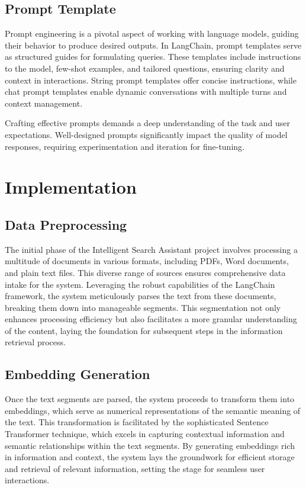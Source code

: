 \documentclass[12pt,a4paper,oneside]{report}
\begin{document}
\section{Prompt Template}
\par Prompt engineering is a pivotal aspect of working with language models, guiding their behavior to produce desired outputs. In LangChain, prompt templates serve as structured guides for formulating queries. These templates include instructions to the model, few-shot examples, and tailored questions, ensuring clarity and context in interactions. String prompt templates offer concise instructions, while chat prompt templates enable dynamic conversations with multiple turns and context management.

Crafting effective prompts demands a deep understanding of the task and user expectations. Well-designed prompts significantly impact the quality of model responses, requiring experimentation and iteration for fine-tuning.

\newpage
\chapter{Implementation}
\section{Data Preprocessing}
\par The initial phase of the Intelligent Search Assistant project involves processing a multitude of documents in various formats, including PDFs, Word documents, and plain text files. This diverse range of sources ensures comprehensive data intake for the system. Leveraging the robust capabilities of the LangChain framework, the system meticulously parses the text from these documents, breaking them down into manageable segments. This segmentation not only enhances processing efficiency but also facilitates a more granular understanding of the content, laying the foundation for subsequent steps in the information retrieval process.

\section{Embedding Generation}
\par Once the text segments are parsed, the system proceeds to transform them into embeddings, which serve as numerical representations of the semantic meaning of the text. This transformation is facilitated by the sophisticated Sentence Transformer technique, which excels in capturing contextual information and semantic relationships within the text segments. By generating embeddings rich in information and context, the system lays the groundwork for efficient storage and retrieval of relevant information, setting the stage for seamless user interactions.
\end{document}
